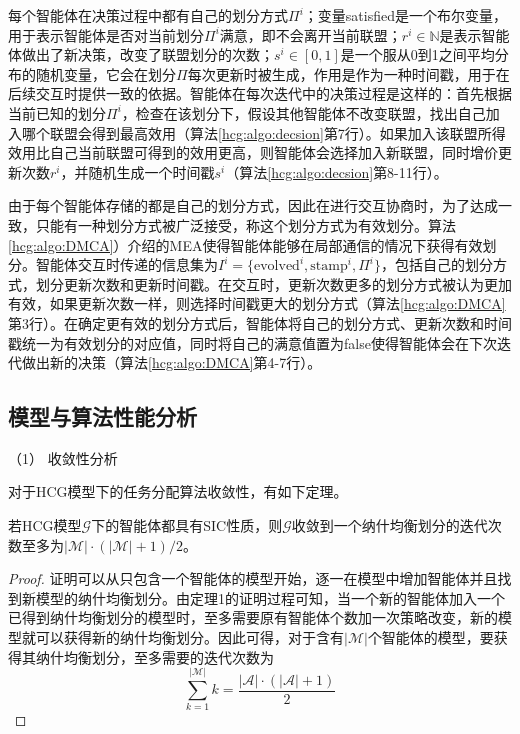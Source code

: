 每个智能体在决策过程中都有自己的划分方式$\Pi^i$；变量satisfied是一个布尔变量，用于表示智能体是否对当前划分$\Pi^i$满意，即不会离开当前联盟；$r^i \in \mathbb{N}$是表示智能体做出了新决策，改变了联盟划分的次数；$s^i \in [0,1]$是一个服从0到1之间平均分布的随机变量，它会在划分$\Pi$每次更新时被生成，作用是作为一种时间戳，用于在后续交互时提供一致的依据。智能体在每次迭代中的决策过程是这样的：首先根据当前已知的划分$\Pi^i$，检查在该划分下，假设其他智能体不改变联盟，找出自己加入哪个联盟会得到最高效用（算法\ref{hcg:algo:decsion}第7行）。如果加入该联盟所得效用比自己当前联盟可得到的效用更高，则智能体会选择加入新联盟，同时增价更新次数$r^i$，并随机生成一个时间戳$s^i$（算法\ref{hcg:algo:decsion}第8-11行）。

由于每个智能体存储的都是自己的划分方式，因此在进行交互协商时，为了达成一致，只能有一种划分方式被广泛接受，称这个划分方式为有效划分。算法\ref{hcg:algo:DMCA}）介绍的MEA使得智能体能够在局部通信的情况下获得有效划分。智能体交互时传递的信息集为$I^i=\{\text{evolved}^i,\text{stamp}^i,\Pi^i\}$，包括自己的划分方式，划分更新次数和更新时间戳。在交互时，更新次数更多的划分方式被认为更加有效，如果更新次数一样，则选择时间戳更大的划分方式（算法\ref{hcg:algo:DMCA}第3行）。在确定更有效的划分方式后，智能体将自己的划分方式、更新次数和时间戳统一为有效划分的对应值，同时将自己的满意值置为false使得智能体会在下次迭代做出新的决策（算法\ref{hcg:algo:DMCA}第4-7行）。


\subsection{模型与算法性能分析}
\label{hcg:performance}

（1） 收敛性分析

对于HCG模型下的任务分配算法收敛性，有如下定理。

\begin{theorem}[收敛性]
\label{hcg:tm:convergence}
	若HCG模型$\mathcal{G}$下的智能体都具有SIC性质，则$\mathcal{G}$收敛到一个纳什均衡划分的迭代次数至多为$|\mathcal{M}|\cdot(|\mathcal{M}|+1)/2$。
	\begin{proof}
		证明可以从只包含一个智能体的模型开始，逐一在模型中增加智能体并且找到新模型的纳什均衡划分。由定理1的证明过程可知，当一个新的智能体加入一个已得到纳什均衡划分的模型时，至多需要原有智能体个数加一次策略改变，新的模型就可以获得新的纳什均衡划分。因此可得，对于含有$|\mathcal{M}|$个智能体的模型，要获得其纳什均衡划分，至多需要的迭代次数为
		\begin{equation}
		\label{hcg:eq:maxIter}
			\sum_{k=1}^{|\mathcal{M}|} k = \frac{|\mathcal{A}|\cdot(|\mathcal{A}|+1)}{2}
		\end{equation}
		
	\end{proof}
\end{theorem}

